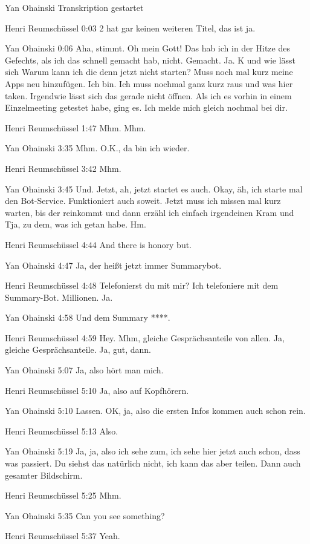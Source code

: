 Yan Ohainski Transkription gestartet

Henri Reumschüssel   0:03
2 hat gar keinen weiteren Titel, das ist ja.

Yan Ohainski   0:06
Aha, stimmt. Oh mein Gott!
Das hab ich in der Hitze des Gefechts, als ich das schnell gemacht hab, nicht.
Gemacht.
Ja.
K und wie lässt sich
Warum kann ich die denn jetzt nicht starten?
Muss noch mal kurz meine Apps neu hinzufügen.
Ich bin.
Ich muss nochmal ganz kurz raus und was hier taken. Irgendwie lässt sich das gerade nicht öffnen. Als ich es vorhin in einem Einzelmeeting getestet habe, ging es. Ich melde mich gleich nochmal bei dir.

Henri Reumschüssel   1:47
Mhm.
Mhm.

Yan Ohainski   3:35
Mhm.
O.K., da bin ich wieder.

Henri Reumschüssel   3:42
Mhm.

Yan Ohainski   3:45
Und.
Jetzt, ah, jetzt startet es auch.
Okay, äh, ich starte mal den Bot-Service.
Funktioniert auch soweit.
Jetzt muss ich mìssen mal kurz warten, bis der reinkommt und dann erzähl ich einfach irgendeinen Kram und
Tja, zu dem, was ich getan habe.
Hm.

Henri Reumschüssel   4:44
And there is honory but.

Yan Ohainski   4:47
Ja, der heißt jetzt immer Summarybot.

Henri Reumschüssel   4:48
Telefonierst du mit mir?
Ich telefoniere mit dem Summary-Bot.
Millionen.
Ja.

Yan Ohainski   4:58
Und dem Summary ****.

Henri Reumschüssel   4:59
Hey.
Mhm, gleiche Gesprächsanteile von allen. Ja, gleiche Gesprächsanteile. Ja, gut, dann.

Yan Ohainski   5:07
Ja, also hört man mich.

Henri Reumschüssel   5:10
Ja, also auf Kopfhörern.

Yan Ohainski   5:10
Lassen.
OK, ja, also die ersten Infos kommen auch schon rein.

Henri Reumschüssel   5:13
Also.

Yan Ohainski   5:19
Ja, ja, also ich sehe zum, ich sehe hier jetzt auch schon, dass was passiert. Du siehst das natürlich nicht, ich kann das aber teilen. Dann auch gesamter Bildschirm.

Henri Reumschüssel   5:25
Mhm.

Yan Ohainski   5:35
Can you see something?

Henri Reumschüssel   5:37
Yeah.

